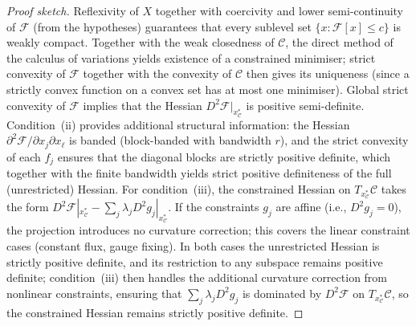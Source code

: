 \documentclass[12pt,a4paper]{article}
\theoremstyle{definition}
\theoremstyle{remark}
\begin{document}
\begin{proof}[Proof sketch]
Reflexivity of $X$ together with coercivity and lower semi-continuity of $\mathcal{F}$ (from the hypotheses) guarantees
that every sublevel set $\{x : \mathcal{F}[x] \le c\}$ is weakly compact.
Together with the weak closedness of $\mathcal{C}$, the direct method of the
calculus of variations yields existence of a constrained minimiser;
strict convexity of $\mathcal{F}$ together with the convexity of $\mathcal{C}$ then gives its uniqueness (since a strictly convex function on a convex set has at most one minimiser).
Global strict convexity of $\mathcal{F}$ implies that
the Hessian $D^2\mathcal{F}|_{x^*_{\mathcal{C}}}$ is positive semi-definite.
Condition~(ii) provides additional structural information: the Hessian
$\partial^2 \mathcal{F}/\partial x_j \partial x_\ell$ is banded
(block-banded with bandwidth $r$), and the strict convexity of each $f_j$
ensures that the diagonal blocks are strictly positive definite, which
together with the finite bandwidth yields strict positive definiteness of
the full (unrestricted) Hessian.
For condition~(iii), the constrained Hessian on $T_{x^*_{\mathcal{C}}}\mathcal{C}$
takes the form $D^2\mathcal{F}|_{x^*_{\mathcal{C}}} - \sum_j \lambda_j D^2 g_j|_{x^*_{\mathcal{C}}}$.
If the constraints $g_j$ are affine (i.e., $D^2 g_j = 0$), the
projection introduces no curvature correction; this covers the linear
constraint cases (constant flux, gauge fixing).
In both cases the unrestricted Hessian is strictly positive definite, and its restriction to any subspace remains positive definite; condition~(iii) then handles the additional curvature correction from nonlinear constraints, ensuring that $\sum_j \lambda_j D^2 g_j$ is dominated by $D^2\mathcal{F}$ on $T_{x^*_{\mathcal{C}}}\mathcal{C}$, so the constrained Hessian remains strictly positive definite.
\end{proof}
\end{document}
